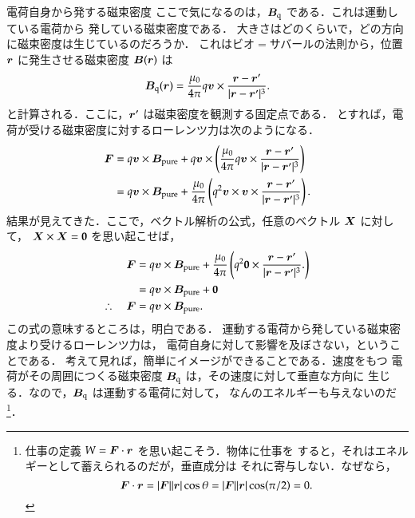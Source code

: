 \begin{memo}{電荷自身から発する磁束密度}
        ここで気になるのは，$\boldsymbol{B}_{\mathrm{q}}$ である．これは運動している電荷から
        発している磁束密度である．
        大きさはどのくらいで，どの方向に磁束密度は生じているのだろうか．
        これはビオ$=$サバールの法則から，位置 $\boldsymbol{r}$ に発生させる磁束密度 $\boldsymbol{B}(\boldsymbol{r})$ は
            \begin{align*}
                \boldsymbol{B}_{\mathrm{q}}(\boldsymbol{r}) =
                \frac{\mu_{0}}{4\pi}q\boldsymbol{v} \times
                \frac{\boldsymbol{r}-\boldsymbol{r}'}{|\boldsymbol{r}-\boldsymbol{r}'|^{3}}.
            \end{align*}
       と計算される．ここに，$\boldsymbol{r}'$ は磁束密度を観測する固定点である．
       とすれば，電荷が受ける磁束密度に対するローレンツ力は次のようになる．
            \begin{align*}
                \boldsymbol{F} &= q \boldsymbol{v} \times \boldsymbol{B}_{\mathrm{pure}} + q \boldsymbol{v} \times
                \left(
                    \frac{\mu_{0}}{4\pi}q\boldsymbol{v} \times \frac{\boldsymbol{r}-\boldsymbol{r}'}{|\boldsymbol{r}-\boldsymbol{r}'|^{3}}
                \right) \\
                &= q \boldsymbol{v} \times \boldsymbol{B}_{\mathrm{pure}} + \frac{\mu_{0}}{4\pi}
                \left( q^{2} \boldsymbol{v} \times \boldsymbol{v} \times \frac{\boldsymbol{r}-\boldsymbol{r}'}{|\boldsymbol{r}-\boldsymbol{r}'|^{3}}
                \right).
            \end{align*}
        結果が見えてきた．ここで，ベクトル解析の公式，任意のベクトル $\boldsymbol{X}$ に対して，
        $\boldsymbol{X} \times \boldsymbol{X} = \textbf{0}$ を思い起こせば，
            \begin{align*}
                \boldsymbol{F} &= q \boldsymbol{v} \times \boldsymbol{B}_{\mathrm{pure}} + \frac{\mu_{0}}{4\pi}
                \left(
                    q^{2} \textbf{0} \times \frac{\boldsymbol{r}-\boldsymbol{r}'}{|\boldsymbol{r}-\boldsymbol{r}'|^{3}}.
                \right)\\
                &= q \boldsymbol{v} \times \boldsymbol{B}_{\mathrm{pure}} + \textbf{0} \\
                \therefore\quad
                \boldsymbol{F} &= q \boldsymbol{v} \times \boldsymbol{B}_{\mathrm{pure}}.
            \end{align*}
        この式の意味するところは，明白である．
        運動する電荷から発している磁束密度より受けるローレンツ力は，
        電荷自身に対して影響を及ぼさない，ということである．
        考えて見れば，簡単にイメージができることである．速度をもつ
        電荷がその周囲につくる磁束密度 $\boldsymbol{B}_{\mathrm{q}}$ は，その速度に対して垂直な方向に
        生じる．なので，$\boldsymbol{B}_{\mathrm{q}}$ は運動する電荷に対して，
        なんのエネルギーも与えないのだ
            \footnote{
                仕事の定義 $W = \boldsymbol{F} \cdot \boldsymbol{r}$ を思い起こそう．物体に仕事を
                すると，それはエネルギーとして蓄えられるのだが，垂直成分は
                それに寄与しない．なぜなら，
                    \begin{equation*}
                        \boldsymbol{F} \cdot \boldsymbol{r} = |\boldsymbol{F}||\boldsymbol{r}| \cos \theta =  |\boldsymbol{F}||\boldsymbol{r}| \cos(\pi/2) = 0.
                    \end{equation*}
            }．
    \end{memo}
